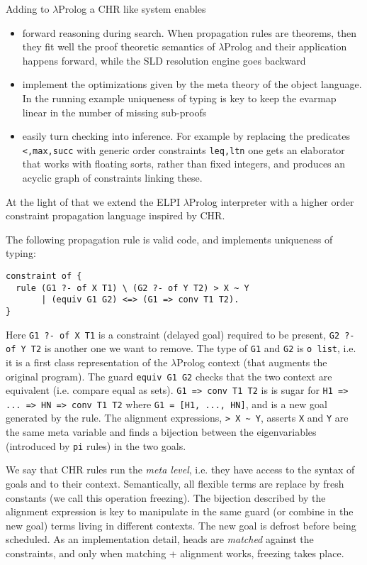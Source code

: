 \documentclass{easychair}
\begin{document}
Adding to $\lambda$Prolog a CHR like system enables
\begin{itemize}
\item forward reasoning during search. When propagation rules are theorems,
	then they fit well the proof theoretic semantics of $\lambda$Prolog
	and their application happens forward, while the SLD resolution engine
	goes backward
\item implement the optimizations given by the meta theory of the object
	language.  In the running example uniqueness of typing is key to keep
	the evarmap linear in the number of missing sub-proofs
\item easily turn checking into inference.  For example by replacing the
	predicates \verb+<,max,succ+ with generic order constraints
	\verb+leq,ltn+ one gets an elaborator that works with floating sorts,
	rather than fixed integers, and produces an acyclic graph of
	constraints linking these.
\end{itemize}

At the light of that we extend the ELPI $\lambda$Prolog interpreter
with a higher order constraint propagation language inspired by CHR.

The following propagation rule is valid code, and implements
uniqueness of typing:

\begin{verbatim}
constraint of {
  rule (G1 ?- of X T1) \ (G2 ?- of Y T2) > X ~ Y
       | (equiv G1 G2) <=> (G1 => conv T1 T2).
}
\end{verbatim}

Here \verb+G1 ?- of X T1+ is a constraint (delayed goal) required
to be present, \verb+G2 ?- of Y T2+ is another one we want to remove.
The type of \verb+G1+ and \verb+G2+ is \verb+o list+, i.e.
it is a first class representation of the $\lambda$Prolog context
(that augments the original program).  
The guard \verb+equiv G1 G2+ checks that the two context are equivalent (i.e.
compare equal as sets).  \verb+G1 => conv T1 T2+ is
is sugar for \verb+H1 => ... => HN => conv T1 T2+ where
\verb+G1 = [H1, ..., HN]+, and is a new goal generated by the rule.
The alignment expressions, \verb+> X ~ Y+, asserts \verb+X+ and \verb+Y+
are the same meta variable and finds a bijection between the
eigenvariables (introduced by \verb+pi+ rules) in the two goals.

We say that CHR rules run the \emph{meta level}, i.e. they have access
to the syntax of goals and to their context.  Semantically, all flexible
terms are replace by fresh constants (we call this operation freezing).
The bijection described by the alignment expression is key to
manipulate in the same guard (or combine in the new goal) terms
living in different contexts.  The new goal is defrost before being
scheduled.  As an implementation detail, heads are \emph{matched} against the
constraints, and only when matching + alignment works, freezing takes place.
\end{document}
